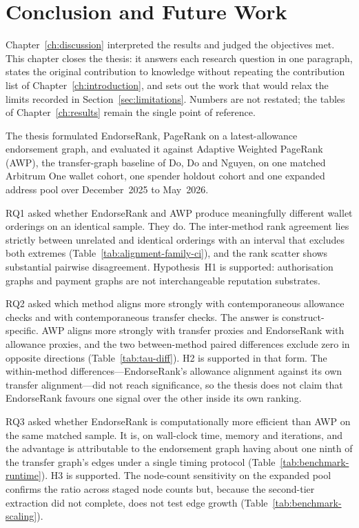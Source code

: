 \chapter{Conclusion and Future Work}
\label{ch:conclusion}

Chapter~\ref{ch:discussion} interpreted the results and judged the objectives met. This chapter closes the thesis: it answers each research question in one paragraph, states the original contribution to knowledge without repeating the contribution list of Chapter~\ref{ch:introduction}, and sets out the work that would relax the limits recorded in Section~\ref{sec:limitations}. Numbers are not restated; the tables of Chapter~\ref{ch:results} remain the single point of reference.


The thesis formulated EndorseRank, PageRank on a latest-allowance endorsement graph, and evaluated it against Adaptive Weighted PageRank (AWP), the transfer-graph baseline of Do, Do and Nguyen, on one matched Arbitrum One wallet cohort, one spender holdout cohort and one expanded address pool over December~2025 to May~2026.

RQ1 asked whether EndorseRank and AWP produce meaningfully different wallet orderings on an identical sample. They do. The inter-method rank agreement lies strictly between unrelated and identical orderings with an interval that excludes both extremes (Table~\ref{tab:alignment-family-ci}), and the rank scatter shows substantial pairwise disagreement. Hypothesis~H1 is supported: authorisation graphs and payment graphs are not interchangeable reputation substrates.

RQ2 asked which method aligns more strongly with contemporaneous allowance checks and with contemporaneous transfer checks. The answer is construct-specific. AWP aligns more strongly with transfer proxies and EndorseRank with allowance proxies, and the two between-method paired differences exclude zero in opposite directions (Table~\ref{tab:tau-diff}). H2 is supported in that form. The within-method differences---EndorseRank's allowance alignment against its own transfer alignment---did not reach significance, so the thesis does not claim that EndorseRank favours one signal over the other inside its own ranking.

RQ3 asked whether EndorseRank is computationally more efficient than AWP on the same matched sample. It is, on wall-clock time, memory and iterations, and the advantage is attributable to the endorsement graph having about one ninth of the transfer graph's edges under a single timing protocol (Table~\ref{tab:benchmark-runtime}). H3 is supported. The node-count sensitivity on the expanded pool confirms the ratio across staged node counts but, because the second-tier extraction did not complete, does not test edge growth (Table~\ref{tab:benchmark-scaling}).


